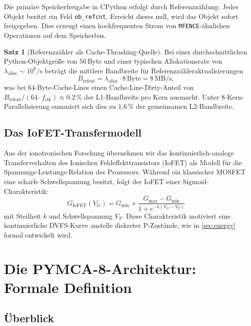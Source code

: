 ﻿\documentclass[a4paper,12pt]{scrreprt}
\theoremstyle{definition}
\newtheorem{satz}{Satz}[section]
\begin{document}
	Die primäre Speicherfreigabe in CPython erfolgt durch Referenzzählung:
	Jedes Objekt besitzt ein Feld \texttt{ob\_refcnt}. Erreicht dieses
	null, wird das Objekt sofort freigegeben. Dies erzeugt einen
	hochfrequenten Strom von \texttt{MFENCE}-ähnlichen Operationen auf
	dem Speicherbus.
	
	\begin{satz}[Referenzzähler als Cache-Thrashing-Quelle]
		\label{satz:refcount}
		Bei einer durchschnittlichen Python-Objektgröße von $56$\,Byte und
		einer typischen Allokationsrate von $\lambda_{\mathrm{alloc}} \sim 10^6/\mathrm{s}$
		beträgt die mittlere Bandbreite für Referenzzähleraktualisierungen
		\[
		B_{\mathrm{refcnt}} = \lambda_{\mathrm{alloc}} \cdot 8\,\mathrm{Byte}
		= 8\,\mathrm{MB/s},
		\]
		was bei $64$-Byte-Cache-Lines einen Cache-Line-Dirty-Anteil von
		$B_{\mathrm{refcnt}} / (64 \cdot f_{\mathrm{clk}}) \approx 0.2\,\%$
		der L1-Bandbreite pro Kern ausmacht. Unter 8-Kern-Parallelisierung
		summiert sich dies zu $1.6\,\%$ der gemeinsamen L2-Bandbreite.
	\end{satz}
	
	\subsection{Das IoFET-Transfermodell}
	
	Aus der ionotronischen Forschung \cite{epp2026iono} übernehmen wir das
	kontinuierlich-analoge Transferverhalten des Ionischen Feldeffekttransistors
	(IoFET) als Modell für die Spannungs-Leistungs-Relation des Prozessors.
	Während ein klassischer MOSFET eine scharfe Schwellspannung besitzt,
	folgt der IoFET einer Sigmoid-Charakteristik:
	\begin{equation}
		G_{\mathrm{IoFET}}(V_G) = G_{\min} + \frac{G_{\max} - G_{\min}}{
			1 + e^{-k(V_G - V_{T})}}
		\label{eq:iofet}
	\end{equation}
	mit Steilheit $k$ und Schwellspannung $V_T$. Diese Charakteristik motiviert
	eine kontinuierliche DVFS-Kurve anstelle diskreter P-Zustände, wie in
	\cref{sec:energy} formal entwickelt wird.
	
	\section{Die PYMCA-8-Architektur: Formale Definition}
	
	\subsection{Überblick}
	
\end{document}
